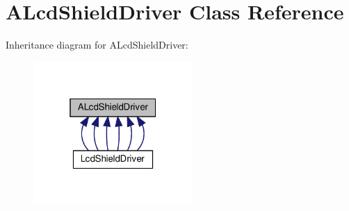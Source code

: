 \hypertarget{classALcdShieldDriver}{}\section{A\+Lcd\+Shield\+Driver Class Reference}
\label{classALcdShieldDriver}


Inheritance diagram for A\+Lcd\+Shield\+Driver\+:
\nopagebreak
\begin{figure}[H]
\begin{center}
\leavevmode
\includegraphics[width=172pt]{classALcdShieldDriver__inherit__graph}
\end{center}
\end{figure}
